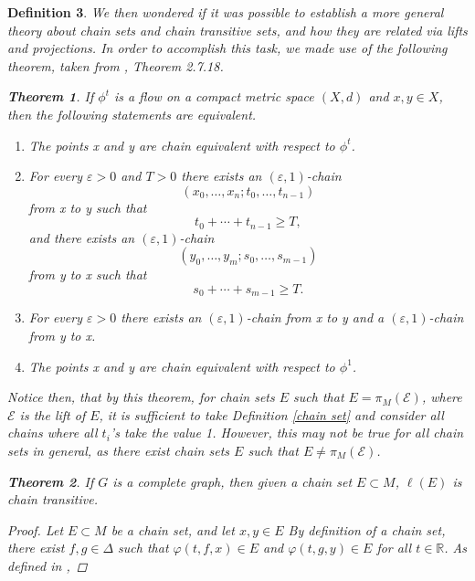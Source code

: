\documentclass[11pt]{article}
\newtheorem{thm}{Theorem}
\newtheorem{defn}[thm]{Definition}
\begin{document}
\begin{defn}
We then wondered if it was possible to establish a more general theory about chain sets and chain transitive sets, and how they are related via lifts and projections.  In order to accomplish this task, we made use of the following theorem, taken from \cite{Alongi}, Theorem 2.7.18.


\begin{thm}\label{h flow}
If $\phi^t$ is a flow on a compact metric space $(X,d)$ and $x,y\in X$, then the following statements are equivalent.
\begin{enumerate}
\item The points x and y are chain equivalent with respect to $\phi^t$.
\item For every $\varepsilon>0$ and $T>0$ there exists an $(\varepsilon,1)$-chain
$$(x_0,\ldots,x_n;t_0,\ldots,t_{n-1})$$
from x to y such that 
$$t_0+\cdots+t_{n-1}\geq T,$$
and there exists an $(\varepsilon,1)$-chain 
$$(y_0,\ldots,y_m;s_0,\ldots,s_{m-1})$$
from y to x such that
$$s_0+\cdots+s_{m-1}\geq T.$$
\item For every $\varepsilon>0$ there exists an $(\varepsilon,1)$-chain from x to y and a $(\varepsilon,1)$-chain from y to x.
\item The points x and y are chain equivalent with respect to $\phi^1$.
\end{enumerate}
\end{thm}

Notice then, that by this theorem, for chain sets $E$ such that $E=\pi_M(\mathcal{E})$, where $\mathcal{E}$ is the lift of $E$, it is sufficient to take Definition \ref{chain set} and consider all chains where all $t_i$'s take the value 1.  However, this may not be true for all chain sets in general, as there exist chain sets $E$ such that $E\not=\pi_M(\mathcal{E})$.  

\begin{thm}\label{chain set lift}
If $G$ is a complete graph, then given a chain set $E\subset M$, $\ell(E)$ is chain transitive.
\end{thm}
\begin{proof}
 Let $E\subset M$ be a chain set, and let $x,y\in E$  By definition of a chain set, there exist $f,g\in\Delta$ such that $\varphi(t,f,x)\in E$ and $\varphi(t,g,y)\in E$ for all $t\in\mathbb{R}$.  As defined in \cite{Ayers2013},


\end{proof}
\end{defn}
\end{document}
